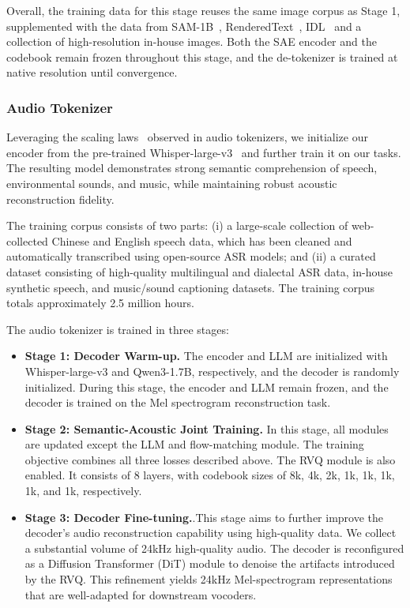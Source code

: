 \documentclass{article}
\begin{document}
\begin{itemize}
Overall, the training data for this stage reuses the same image corpus as Stage 1, supplemented with the data from SAM-1B~\cite{kirillov2023segment}, RenderedText~\cite{wendler2024renderedtext}, IDL~\cite{biten2022ocr} and a collection of high-resolution in-house images. Both the SAE encoder and the codebook remain frozen throughout this stage, and the de-tokenizer is trained at native resolution until convergence.
\end{itemize}

\subsubsection{Audio Tokenizer}


Leveraging the scaling laws~\cite{parker2024scaling} observed in audio tokenizers, we initialize our encoder from the pre-trained Whisper-large-v3~\cite{radford2022whisper} and further train it on our tasks. The resulting model demonstrates strong semantic comprehension of speech, environmental sounds, and music, while maintaining robust acoustic reconstruction fidelity.



The training corpus consists of two parts: (i) a large-scale collection of web-collected Chinese and English speech data, which has been cleaned and automatically transcribed using open-source ASR models; and (ii) a curated dataset consisting of high-quality multilingual and dialectal ASR data, in-house synthetic speech, and music/sound captioning datasets. The training corpus totals approximately 2.5 million hours.


The audio tokenizer is trained in three stages:

\begin{itemize}
    

\item \textbf{Stage 1: Decoder Warm-up.} The encoder and LLM are initialized with Whisper-large-v3 and Qwen3-1.7B, respectively, and the decoder is randomly initialized. During this stage, the encoder and LLM remain frozen, and the decoder is trained on the Mel spectrogram reconstruction task.


        
    \item \textbf{Stage 2: Semantic-Acoustic Joint Training.} In this stage, all modules are updated except the LLM and flow-matching module. The training objective combines all three losses described above. The RVQ module is also enabled. It consists of 8 layers, with codebook sizes of 8k, 4k, 2k, 1k, 1k, 1k, 1k, and 1k, respectively.



    
    \item \textbf{Stage 3: Decoder Fine-tuning.}.This stage aims to further improve the decoder's audio reconstruction capability using high-quality data. We collect a substantial volume of 24kHz high-quality audio. The decoder is reconfigured as a Diffusion Transformer (DiT) module to denoise the artifacts introduced by the RVQ. This refinement yields 24kHz Mel-spectrogram representations that are well-adapted for downstream vocoders.
\end{itemize}
\end{document}
